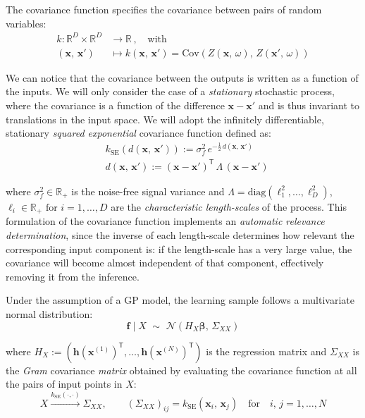 \noindent
The covariance function specifies the covariance between pairs of random variables:
%
\begin{align}
    k\colon\mathbb{R}^{D}\times\mathbb{R}^{D}&\to\mathbb{R}\,,\quad\text{with} \\
    (\mathbf{x},\,\mathbf{x}')&\mapsto k(\mathbf{x},\,\mathbf{x}') = \text{Cov}(Z(\mathbf{x},\,\omega),\, Z(\mathbf{x}',\,\omega))
\end{align}

\noindent
We can notice that the covariance between the outputs is written as a function of the inputs. We will only consider the case of a \textit{stationary} stochastic process, where the covariance is a function of the difference $\mathbf{x}-\mathbf{x}'$ and is thus invariant to translations in the input space. We will adopt the infinitely differentiable, stationary \textit{squared exponential} covariance function defined as:
%
\begin{align}
     &k_{\text{SE}}(d(\mathbf{x},\,\mathbf{x}')) := \sigma_f^2\, e^{-\frac{1}{2}\,d(\mathbf{x},\,\mathbf{x}')} \\
     &d(\mathbf{x},\,\mathbf{x}') := (\mathbf{x}-\mathbf{x}')^\mathsf{T}\,\Lambda\,(\mathbf{x}-\mathbf{x}')
\end{align}

\noindent
where $\sigma_f^2\in\mathbb{R}_{+}$ is the noise-free signal variance and $\Lambda=\text{diag}(\ell_1^2,\dots,\ell_D^2)$, $\ell_i\in\mathbb{R}_{+}\,\,\text{for}\,\,i=1,\dots,D$ are the \textit{characteristic length-scales} of the process. This formulation of the covariance function implements an \textit{automatic relevance determination}, since the inverse of each length-scale determines how relevant the corresponding input component is: if the length-scale has a very large value, the covariance will become almost independent of that component, effectively removing it from the inference.

\vspace{0.2cm}
Under the assumption of a GP model, the learning sample follows a multivariate normal distribution:
\begin{equation}
    \mathbf{f}\;\vert\; X \,\,\sim\,\, \mathcal{N}(H_{X}\boldsymbol{\beta},\,\Sigma_{XX})
\end{equation}

\noindent
where $H_{X}:=(\mathbf{h}(\mathbf{x}^{(1)})^\mathsf{T},\dots,\mathbf{h}(\mathbf{x}^{(N)})^\mathsf{T})$ is the regression matrix and $\Sigma_{XX}$ is the \textit{Gram} covariance \textit{matrix} obtained by evaluating the covariance function at all the pairs of input points in $X$:
\begin{equation}
    X\xrightarrow{k_{\text{SE}}(\cdot,\cdot)}\Sigma_{XX},\qquad \left(\Sigma_{XX}\right)_{ij} = k_{\text{SE}}(\mathbf{x}_i,\,\mathbf{x}_j)\quad\text{for}\quad i,\,j=1,\dots,N
\end{equation}

